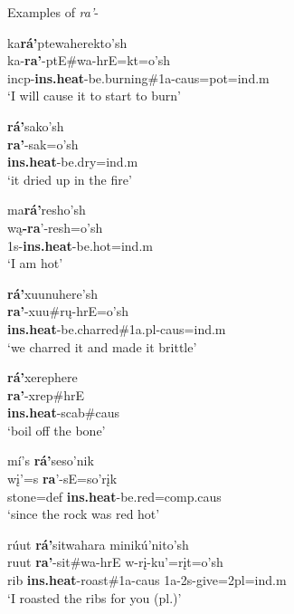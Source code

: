 \begin{exe}
\item\label{ra'examples} Examples of \textit{ra'}-

	\begin{xlist}
	
	\item \glll ka\textbf{rá'}ptewaherekto'sh\\
	ka-\textbf{ra'}-ptE\#wa-hrE=kt=o'sh\\
	incp-\textbf{ins.heat}-\textnormal{be.burning}\#1a-caus=pot=ind.m\\
	\glt `I will cause it to start to burn' \citep[47]{hollow1973b}
	
	\item \glll \textbf{rá'}sako'sh\\
	\textbf{ra'}-sak=o'sh\\
	\textbf{ins.heat}-\textnormal{be.dry}=ind.m\\
	\glt `it dried up in the fire' \citep[198]{hollow1970}
	
	\item \glll ma\textbf{rá'}resho'sh\\
	wą\textbf{-ra}'-resh=o'sh\\
	1s-\textbf{ins.heat}-\textnormal{be.hot}=ind.m\\
	\glt `I am hot' \citep[463]{hollow1970}
	
	\item \glll \textbf{rá'}xuunuhere'sh\\
	\textbf{ra'}-xuu\#rų-hrE=o'sh\\
	\textbf{ins.heat}-\textnormal{be.charred}\#1a.pl-caus=ind.m\\
	\glt `we charred it and made it brittle' \citep[330]{hollow1970}
	
	\item \glll \textbf{rá'}xerephere\\
	\textbf{ra'}-xrep\#hrE\\
	\textbf{ins.heat}-\textnormal{scab}\#caus\\
	\glt `boil off the bone' \citep[12]{kennard1936}
	
	\item \glll mí's \textbf{rá'}seso'nik\\
	wį'=s \textbf{ra}'-sE=so'rįk\\
	\textnormal{stone}=def \textbf{ins.heat}-\textnormal{be.red}=comp.caus\\
	\glt `since the rock was red hot' \citep[97]{hollow1973a}
	
	\item \glll rúut \textbf{rá'}sitwahara minikú'nito'sh\\
	ruut \textbf{ra'}-sit\#wa-hrE w-rį-ku'=rįt=o'sh\\
	\textnormal{rib} \textbf{ins.heat}-\textnormal{roast}\#1a-caus 1a-2s-\textnormal{give}=2pl=ind.m\\
	\glt `I roasted the ribs for you (pl.)' \citep[177]{hollow1973a} 
	
	\end{xlist}

\end{exe}


